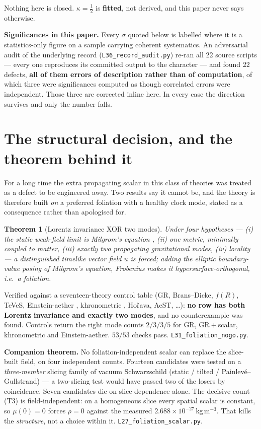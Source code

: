 \documentclass[11pt,letterpaper]{article}
\newtheorem{theorem}{Theorem}
\begin{document}
Nothing here is closed. $\kappa=\tfrac12$ is \textbf{fitted}, not derived, and this paper never says otherwise.

\textbf{Significances in this paper.} Every $\sigma$ quoted below is labelled where it is a statistics-only figure on a sample carrying coherent systematics. An adversarial audit of the underlying record (\texttt{L36\_record\_audit.py}) re-ran all 22 source scripts --- every one reproduces its committed output to the character --- and found 22 defects, \textbf{all of them errors of description rather than of computation}, of which three were significances computed as though correlated errors were independent. Those three are corrected inline here. In every case the direction survives and only the number falls.

\section{The structural decision, and the theorem behind it}
For a long time the extra propagating scalar in this class of theories \cite{aest,bekenstein04} was treated as a defect to be engineered away. Two results say it cannot be, and the theory is therefore built \emph{on} a preferred foliation with a healthy clock mode, stated as a consequence rather than apologised for.

\begin{theorem}[Lorentz invariance XOR two modes]
Under four hypotheses --- (i) the static weak-field limit is Milgrom's equation \cite{milgrom83,bm84}, (ii) one metric, minimally coupled to matter, (iii) exactly two propagating gravitational modes, (iv) \emph{locality} --- a distinguished timelike vector field $u$ is forced; adding the elliptic boundary-value posing of Milgrom's equation, Frobenius makes it hypersurface-orthogonal, i.e.\ a foliation.
\end{theorem}
Verified against a seventeen-theory control table (GR, Brans--Dicke, $f(R)$, TeVeS, Einstein-aether \cite{jacobson01}, khronometric \cite{blas11}, Ho\v{r}ava, AeST, \dots): \textbf{no row has both Lorentz invariance and exactly two modes}, and no counterexample was found. Controls return the right mode counts $2/3/3/5$ for GR, GR${}+{}$scalar, khronometric and Einstein-aether. $53/53$ checks pass. \texttt{L31\_foliation\_nogo.py}.

\textbf{Companion theorem.} No foliation-independent scalar can replace the slice-built field, on four independent counts. Fourteen candidates were tested on a \emph{three-member} slicing family of vacuum Schwarzschild (static / tilted / Painlev\'e--Gullstrand) --- a two-slicing test would have passed two of the losers by coincidence. Seven candidates die on slice-dependence alone. The decisive count (T3) is field-independent: on a homogeneous slice every spatial scalar is constant, so $\mu(0)=0$ forces $\rho=0$ against the measured $2.688\times10^{-27}$\,kg\,m$^{-3}$. That kills the \emph{structure}, not a choice within it. \texttt{L27\_foliation\_scalar.py}.
\end{document}
